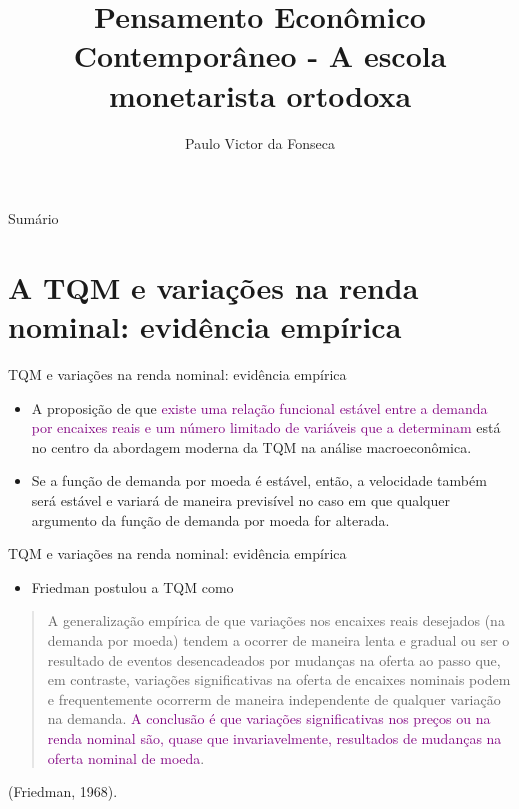 \documentclass[10pt]{beamer}
\title[]{Pensamento Econômico Contemporâneo - A escola monetarista ortodoxa}
\author[]{Paulo Victor da Fonseca}
\date{}
\begin{document}
\begin{frame}[plain]
\end{frame}

\begin{frame}{Sumário}
    \tableofcontents
\end{frame}

\section{A TQM e variações na renda nominal: evidência empírica}
\begin{frame}{TQM e variações na renda nominal: evidência empírica}
    \begin{itemize}
        \item A proposição de que \textcolor{purple}{existe uma relação funcional estável entre a demanda por encaixes reais e um número limitado de variáveis que a determinam} está no centro da abordagem moderna da TQM na análise macroeconômica.
        \bigskip
        \item Se a função de demanda por moeda é estável, então, a velocidade também será estável e variará de maneira previsível no caso em que qualquer argumento da função de demanda por moeda for alterada.
    \end{itemize}
\end{frame}

\begin{frame}{TQM e variações na renda nominal: evidência empírica}
    \begin{itemize}
        \item Friedman postulou a TQM como
    \end{itemize}
    \begin{quote}
        A generalização empírica de que variações nos encaixes reais desejados (na demanda por moeda) tendem a ocorrer de maneira lenta e gradual ou ser o resultado de eventos desencadeados por mudanças na oferta ao passo que, em contraste, variações significativas na oferta de encaixes nominais podem e frequentemente ocorrerm de maneira independente de qualquer variação na demanda. \textcolor{purple}{A conclusão é que variações significativas nos preços ou na renda nominal são, quase que invariavelmente, resultados de mudanças na oferta nominal de moeda}.
    \end{quote}
    \begin{flushright}
    (Friedman, 1968).
    \end{flushright}
\end{frame}
\end{document}
